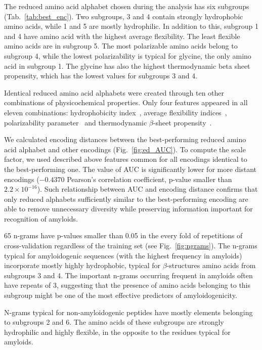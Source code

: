 \documentclass{bioinfo}
\begin{document}
The reduced amino acid alphabet chosen during the analysis has six subgroups 
(Tab.~\ref{tab:best_enc}). Two subgroups, 3 and 4 contain strongly hydrophobic 
amino acids, while 1 and 5 are mostly hydrophilic. In addition to this, subgroup 
1 and 4 have amino acid with the highest average flexibility. The least flexible 
amino acids are in subgroup 5. The most polarizable amino acids belong to 
subgroup 4, while the lowest polarizability is typical for glycine, the only 
amino acid in subgroup 1. The glycine has also the highest thermodynamic beta 
sheet propensity, which has the lowest values for subgroups 3 and 4.

  Identical reduced amino acid alphabets were created through ten other 
combinations of physicochemical properties. Only four features appeared in all 
eleven combinations: hydrophobicity index~\citep{argos_structural_1982}, average 
flexibility indices~\citep{bhaskaran_positional_1988}, polarizability 
parameter~\citep{charton_structural_1982} and thermodynamic $\beta$-sheet 
propensity~\citep{kim_thermodynamic_1993}.

  We calculated encoding distances between the best-performing reduced amino 
acid alphabet and other encodings (Fig.~\ref{fig:ed_AUC}). To compute the scale 
factor, we used described above features common for all encodings identical to 
the best-performing one. The value of AUC is significantly lower for more 
distant encodings ($-0.4370$ Pearson's correlation coefficient, p-value smaller 
than $2.2 \times 10^{-16}$). Such relationship between AUC and encoding distance 
confirms that only reduced alphabets sufficiently similar to the best-performing 
encoding are able to remove unnecessary diversity while preserving information 
important for recognition of amyloids.

  65 n-grams have p-values smaller than 0.05 in the every fold of repetitions of 
cross-validation regardless of the training set (see Fig.~\ref{fig:ngrams}). The 
n-grams typical for amyloidogenic sequences (with the highest frequency in 
amyloids) incorporate mostly highly hydrophobic, typical for $\beta$-structures 
amino acids from subgroups 3 and 4. The important n-grams occurring frequent in 
amyloids often have repeats of 3, suggesting that the presence of amino acids 
belonging to this subgroup might be one of the most effective predictors of 
amyloidogenicity.

  N-grams typical for non-amyloidogenic peptides have mostly elements 
belonging to subgroups 2 and 6. The amino acids of these subgroups are strongly 
hydrophilic and highly flexible, in the opposite to the residues typical for 
amyloids.
\end{document}
